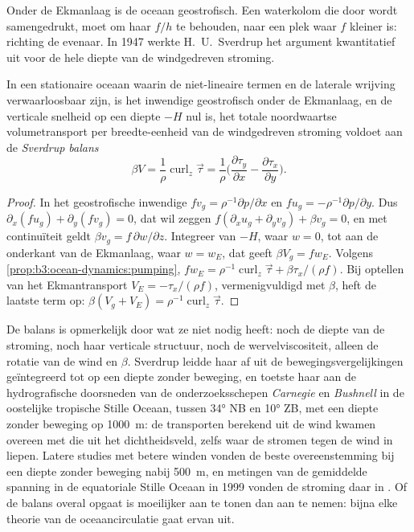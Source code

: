 Onder de Ekmanlaag is de oceaan geostrofisch. Een waterkolom die
door  wordt samengedrukt, moet om haar  $f/h$ te behouden,
naar een plek waar $f$ kleiner is: richting de evenaar. In 1947 werkte H.~U.~Sverdrup
het argument kwantitatief uit voor de hele diepte van de windgedreven stroming.

\begin{theorem}[Sverdrupbalans]\label{thm:b3:ocean-dynamics:sverdrup}
In een stationaire oceaan waarin de niet-lineaire termen en de laterale wrijving
verwaarloosbaar zijn, is het inwendige geostrofisch onder de Ekmanlaag, en de
verticale snelheid op een diepte $-H$ nul is, het totale noordwaartse volumetransport
per breedte-eenheid van de windgedreven stroming voldoet aan de \emph{Sverdrup
balans}
\[
\beta V = \frac{1}{\rho}\operatorname{curl}_z\vec\tau
= \frac{1}{\rho}\Big(\frac{\partial\tau_y}{\partial x} -
\frac{\partial\tau_x}{\partial y}\Big) .
\]
\end{theorem}

\begin{proof}
In het geostrofische inwendige $fv_g = \rho^{-1}\partial p/\partial x$ en
$fu_g = -\rho^{-1}\partial p/\partial y$. Dus $\partial_x(fu_g) +
\partial_y(fv_g) = 0$, dat wil zeggen $f(\partial_xu_g + \partial_yv_g) + \beta
v_g = 0$, en met continuïteit geldt $\beta v_g = f\,\partial w/\partial z$.
Integreer van $-H$, waar $w = 0$, tot aan de onderkant van de Ekmanlaag,
waar $w = w_E$, dat geeft $\beta V_g = fw_E$. Volgens
\cref{prop:b3:ocean-dynamics:pumping}, $fw_E = \rho^{-1}\operatorname{curl}_z
\vec\tau + \beta\tau_x/(\rho f)$. Bij optellen van het Ekmantransport $V_E =
-\tau_x/(\rho f)$, vermenigvuldigd met $\beta$, heft de laatste term op:
$\beta(V_g + V_E) = \rho^{-1}\operatorname{curl}_z\vec\tau$.
\end{proof}

De balans is opmerkelijk door wat ze niet nodig heeft: noch de diepte van
de stroming, noch haar verticale structuur, noch de wervelviscositeit, alleen de
rotatie van de wind en $\beta$. Sverdrup leidde haar af uit de bewegingsvergelijkingen
geïntegreerd tot op een diepte zonder beweging, en toetste haar aan de
hydrografische doorsneden van de onderzoeksschepen \emph{Carnegie} en
\emph{Bushnell} in de oostelijke tropische Stille Oceaan, tussen \ang{34} NB en
\ang{10} ZB, met een diepte zonder beweging op \qty{1000}{m}: de transporten
berekend uit de wind kwamen overeen met die uit het dichtheidsveld, zelfs
waar de stromen tegen de wind in liepen. Latere studies met betere winden
vonden de beste overeenstemming bij een diepte zonder beweging nabij \qty{500}{m}, en
metingen van de gemiddelde spanning in de equatoriale Stille Oceaan in 1999 vonden de
stroming daar in . Of de balans overal opgaat is
moeilijker aan te tonen dan aan te nemen: bijna elke theorie van de oceaancirculatie
gaat ervan uit.

